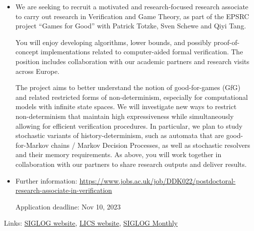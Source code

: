 \documentclass[prodmode,acmtecs]{acmsmall} %
\begin{document}
\begin{itemize}\item  We are seeking to recruit a motivated and research-focused research associate to carry out research in Verification and Game Theory, as part of the EPSRC project ``Games for Good'' with Patrick Totzke, Sven Schewe and Qiyi Tang.  
 
  You will enjoy developing algorithms, lower bounds, and possibly proof-of-concept implementations related to computer-aided formal verification. The position includes collaboration with our academic partners and research visits across Europe.  
 
  The project aims to better understand the notion of good-for-games (GfG) and related restricted forms of non-determinism, especially for computational models with infinite state spaces. We will investigate new ways to restrict non-determinism that maintain high expressiveness while simultaneously allowing for efficient verification procedures. In particular, we plan to study stochastic variants of history-determinism, such as automata that are good-for-Markov chains / Markov Decision Processes, as well as stochastic resolvers and their memory requirements. As above, you will work together in collaboration with our partners to share research outputs and deliver results. 
 
\item  Further information: \href{https://www.jobs.ac.uk/job/DDK022/postdoctoral-research-associate-in-verification}{https://www.jobs.ac.uk/job/DDK022/postdoctoral-research-associate-in-verification} 
 
Application deadline: Nov 10, 2023 
 
\end{itemize}


\bigskip Links: \href{http://siglog.org/}{SIGLOG website}, \href{https://lics.siglog.org}{LICS website}, \href{https://lics.siglog.org/newsletters/}{SIGLOG Monthly}
\end{document}
